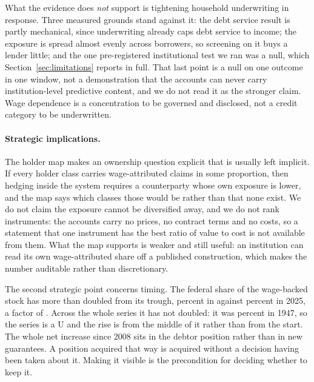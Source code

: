 What the evidence does \emph{not} support is tightening household underwriting in response. Three
measured grounds stand against it: the debt service result is partly mechanical, since
underwriting already caps debt service to income; the exposure is spread almost evenly across
borrowers, so screening on it buys a lender little; and the one pre-registered institutional
test we ran was a null, which Section~\ref{sec:limitations} reports in full. That last point
is a null on one outcome in one window, not a demonstration that the accounts can never carry
institution-level predictive content, and we do not read it as the stronger claim. Wage
dependence is a concentration to be governed and disclosed, not a credit category to be
underwritten.

\paragraph{Strategic implications.} The holder map makes an ownership question explicit that is
usually left implicit. If every holder class carries wage-attributed claims in some proportion,
then hedging inside the system requires a counterparty whose own exposure is lower, and the map
says which classes those would be rather than that none exist. We do not claim the exposure
cannot be diversified away, and we do not rank instruments: the accounts carry no prices, no
contract terms and no costs, so a statement that one instrument has the best ratio of value to
cost is not available from them. What the map supports is weaker and still useful: an
institution can read its own wage-attributed share off a published construction, which makes the
number auditable rather than discretionary.

The second strategic point concerns timing. The federal share of the wage-backed stock has
more than doubled from its trough,  percent in  against
 percent in 2025, a factor of . Across the whole series it
has not doubled: it was  percent in 1947, so the series is a U and the rise is
from the middle of it rather than from the start. The whole net increase since 2008 sits in the
debtor position rather than in new guarantees. A position acquired that way is acquired without a
decision having been taken about it. Making it visible is the precondition for deciding whether
to keep it.

